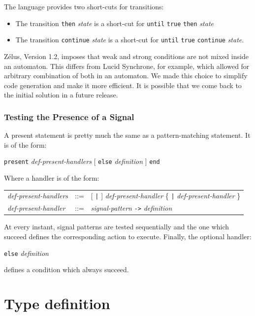 \documentclass[11pt,titlepage,twoside]{report}
\newcommand{\zelus}{{\sf Z\'elus}}
\newcommand{\lucy}{{\sf Lucid Synchrone}}
\newcommand{\Then}{\mbox{{\tt then}}}
\newcommand{\Until}{\mbox{\tt until}}
\newcommand{\Continue}{\mbox{\tt continue}}
\newcommand{\term}[1]{{\tt #1}}
\newcommand{\nterm}[1]{{\em #1}}
\begin{document}
The language provides two short-cuts for transitions:

\begin{itemize}
\item
  The transition \term{\Then} \nterm{state} is a short-cut for
  \term{\Until} {\tt true}
  \term{\Then} \nterm{state}
\item
  The transition \term{\Continue} \nterm{state} is a short-cut
  for \term{\Until} {\tt true} \term{\Continue} \nterm{state}.
\end{itemize}

\zelus, Version 1.2, imposes that weak and strong conditions are not mixed inside
an automaton. This differs from \lucy, for example, which allowed for arbitrary
combination of both in an automaton. We made this choice to simplify code
generation and make it more efficient. It is possible that we come back to
the initial solution in a future release.

\subsubsection{Testing the Presence of a Signal}

A present statement is pretty much the same as a pattern-matching
statement. It is of the form: 
\begin{center}
  \term{present} \nterm{def-present-handlers} [ \term{else} \nterm{definition} ]
  \term{end}
\end{center}
Where a handler is of the form:
\begin{center}
\begin{tabular}{lcl}
\nterm{def-present-handlers}
   & ::=        & [ \term{|} ] \nterm{def-present-handler}
                  \{ \term{|} \nterm{def-present-handler} \} 
\\
\nterm{def-present-handler}
   & ::=        & \nterm{signal-pattern} \term{->} \nterm{definition}
\end{tabular}
\end{center}
At every instant, signal patterns are tested sequentially and the one which succeed
defines the corresponding action to execute. Finally, the optional handler:
\begin{center} 
  \term{else} \nterm{definition}
\end{center}
defines a condition which always succeed.

\section{Type definition\label{langtypedefs}} %
\end{document}

